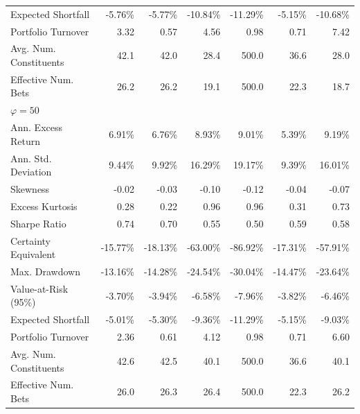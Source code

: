 \begin{tabular*}{\textwidth}{l@{\extracolsep{\fill}}rrrrrr}
Expected Shortfall & -5.76\% & -5.77\% & -10.84\% & -11.29\% & -5.15\% & -10.68\% \\
Portfolio Turnover & 3.32 & 0.57 & 4.56 & 0.98 & 0.71 & 7.42 \\
Avg. Num. Constituents & 42.1 & 42.0 & 28.4 & 500.0 & 36.6 & 28.0 \\
Effective Num. Bets & 26.2 & 26.2 & 19.1 & 500.0 & 22.3 & 18.7 \\
\midrule
\multicolumn{7}{l}{\textit{$\varphi = 50$}} \\
\midrule
Ann. Excess Return & 6.91\% & 6.76\% & 8.93\% & 9.01\% & 5.39\% & 9.19\% \\
Ann. Std. Deviation & 9.44\% & 9.92\% & 16.29\% & 19.17\% & 9.39\% & 16.01\% \\
Skewness & -0.02 & -0.03 & -0.10 & -0.12 & -0.04 & -0.07 \\
Excess Kurtosis & 0.28 & 0.22 & 0.96 & 0.96 & 0.31 & 0.73 \\
Sharpe Ratio & 0.74 & 0.70 & 0.55 & 0.50 & 0.59 & 0.58 \\
Certainty Equivalent & -15.77\% & -18.13\% & -63.00\% & -86.92\% & -17.31\% & -57.91\% \\
Max. Drawdown & -13.16\% & -14.28\% & -24.54\% & -30.04\% & -14.47\% & -23.64\% \\
Value-at-Risk (95\%) & -3.70\% & -3.94\% & -6.58\% & -7.96\% & -3.82\% & -6.46\% \\
Expected Shortfall & -5.01\% & -5.30\% & -9.36\% & -11.29\% & -5.15\% & -9.03\% \\
Portfolio Turnover & 2.36 & 0.61 & 4.12 & 0.98 & 0.71 & 6.60 \\
Avg. Num. Constituents & 42.6 & 42.5 & 40.1 & 500.0 & 36.6 & 40.1 \\
Effective Num. Bets & 26.0 & 26.3 & 26.4 & 500.0 & 22.3 & 26.2 \\
\bottomrule
\end{tabular*}
